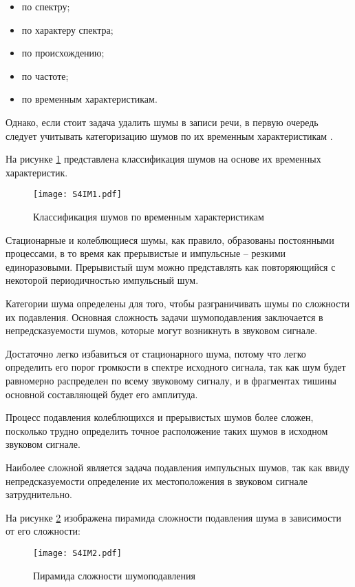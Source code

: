 \begin{itemize}
    \item по спектру;
    \item по характеру спектра;
    \item по происхождению;
    \item по частоте;
    \item по временным характеристикам.
\end{itemize}

Однако, если стоит задача удалить шумы в записи речи,
в первую очередь следует учитывать категоризацию шумов
по их временным характеристикам \cite{asr_end2end}.

На рисунке \ref{fig:section4:time_classification} представлена 
классификация шумов на основе их временных характеристик.

\begin{figure}[h!]
    \centering
    \texttt{[image: S4IM1.pdf]}
    \caption{Классификация шумов по временным характеристикам}
    \label{fig:section4:time_classification}
\end{figure}

Стационарные и колеблющиеся шумы, как правило, образованы
постоянными процессами, в то время как
прерывистые и импульсные -- резкими единоразовыми.
Прерывистый шум можно представлять как повторяющийся с некоторой
периодичностью импульсный шум.

Категории шума определены для того, чтобы разграничивать шумы по
сложности их подавления. 
Основная сложность задачи шумоподавления заключается в 
непредсказуемости шумов, которые могут возникнуть в звуковом сигнале. 

Достаточно легко избавиться от стационарного шума, потому что
легко определить его порог громкости в спектре исходного сигнала,
так как шум будет равномерно распределен по всему звуковому сигналу,
и в фрагментах тишины основной составляющей будет его амплитуда.

Процесс подавления колеблющихся и прерывистых шумов более сложен,
посколько трудно определить точное расположение таких шумов в
исходном звуковом сигнале.

Наиболее сложной является задача подавления импульсных шумов, так как 
ввиду непредсказуемости определение их местоположения 
в звуковом сигнале затруднительно.

На рисунке \ref{fig:section4:noise_pyramid} изображена 
пирамида сложности подавления шума в зависимости от его сложности:

\begin{figure}[h!]
    \centering
    \texttt{[image: S4IM2.pdf]}
    \caption{Пирамида сложности шумоподавления}
    \label{fig:section4:noise_pyramid}
\end{figure}

